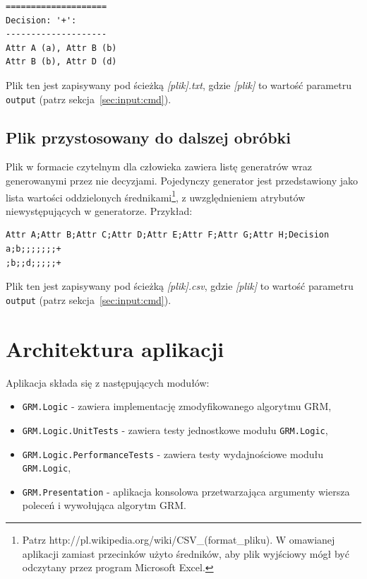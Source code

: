 \documentclass[a4paper,10pt]{article}
\begin{document}
\begin{verbatim}
====================
Decision: '+':
--------------------
Attr A (a), Attr B (b)
Attr B (b), Attr D (d)
\end{verbatim}

 Plik ten jest zapisywany pod ścieżką \emph{[plik].txt}, gdzie \emph{[plik]} to wartość parametru \verb+output+ (patrz sekcja~\ref{sec:input:cmd}).

 
 \subsection{Plik przystosowany do dalszej obróbki} \label{sec:output:csv}
 Plik w formacie czytelnym dla człowieka zawiera listę generatrów wraz generowanymi przez nie decyzjami.
 Pojedynczy generator jest przedstawiony jako lista wartości oddzielonych średnikami\footnote{Patrz http://pl.wikipedia.org/wiki/CSV\_(format\_pliku). W omawianej aplikacji zamiast przecinków użyto średników, aby plik wyjściowy mógł być odczytany przez program Microsoft Excel.}, z uwzględnieniem atrybutów niewystępujących w generatorze.
 Przykład:
 
\begin{verbatim}
Attr A;Attr B;Attr C;Attr D;Attr E;Attr F;Attr G;Attr H;Decision
a;b;;;;;;;+
;b;;d;;;;;+
\end{verbatim}
 
 Plik ten jest zapisywany pod ścieżką \emph{[plik].csv}, gdzie \emph{[plik]} to wartość parametru \verb+output+ (patrz sekcja~\ref{sec:input:cmd}).



\section{Architektura aplikacji} \label{sec:arch}
Aplikacja składa się z następujących modułów:

\begin{itemize}
 \item \verb+GRM.Logic+ - zawiera implementację zmodyfikowanego algorytmu GRM,
 \item \verb+GRM.Logic.UnitTests+ - zawiera testy jednostkowe modułu \verb+GRM.Logic+,
 \item \verb+GRM.Logic.PerformanceTests+ - zawiera testy wydajnościowe modułu \verb+GRM.Logic+, 
 \item \verb+GRM.Presentation+ - aplikacja konsolowa przetwarzająca argumenty wiersza poleceń i wywołująca algorytm GRM.
\end{itemize}
\end{document}
